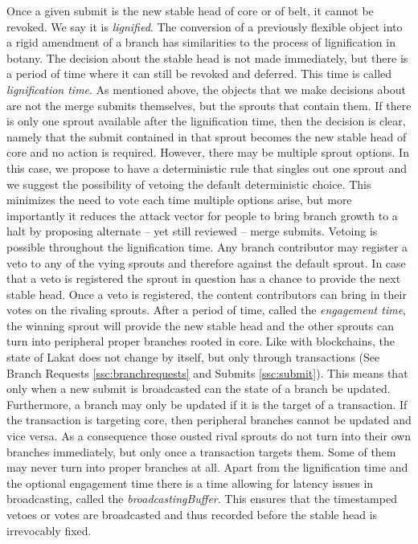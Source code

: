 Once a given submit is the new stable head of core or of belt, it cannot be revoked. We say it is \textit{lignified}. The conversion of a previously flexible object into a rigid amendment of a branch has similarities to the process of lignification in botany. 
The decision about the stable head is not made immediately, but there is a period of time where it can still be revoked and deferred. This time is called \textit{lignification time}. As mentioned above, the objects that we make decisions about are not the merge submits themselves, but the sprouts that contain them. If there is only one sprout available after the lignification time, then the decision is clear, namely that the submit contained in that sprout becomes the new stable head of core and no action is required. However, there may be multiple sprout options. In this case, we propose to have a deterministic rule that singles out one sprout and we suggest the possibility of vetoing the default deterministic choice. This minimizes the need to vote each time multiple options arise, but more importantly it reduces the attack vector for people to bring branch growth to a halt by proposing alternate -- yet still reviewed -- merge submits. Vetoing is possible throughout the lignification time. Any branch contributor may register a veto to any of the vying sprouts and therefore against the default sprout. In case that a veto is registered the sprout in question has a chance to provide the next stable head. 
Once a veto is registered, the content contributors can bring in their votes on the rivaling sprouts. After a period of time, called the \textit{engagement time}, the winning sprout will provide the new stable head and the other sprouts can turn into peripheral proper branches rooted in core. Like with blockchains, the state of Lakat does not change by itself, but only through transactions (See Branch Requests \ref{ssc:branchrequests} and Submits \ref{ssc:submit}). This means that only when a new submit is broadcasted can the state of a branch be updated. Furthermore, a branch may only be updated if it is the target of a transaction. If the transaction is targeting core, then peripheral branches cannot be updated and vice versa. As a consequence those ousted rival sprouts do not turn into their own branches immediately, but only once a transaction targets them. Some of them may never turn into proper branches at all. Apart from the lignification time and the optional engagement time there is a time allowing for latency issues in broadcasting, called the \textit{broadcastingBuffer}. This ensures that the timestamped vetoes or votes are broadcasted and thus recorded before the stable head is irrevocably fixed.

